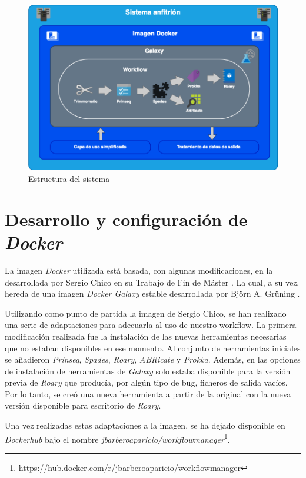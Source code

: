 \begin{figure}
    \begin{center}
      \includegraphics[scale=0.45]{images/DiagramaDelSistema.png}
      \caption{Estructura del sistema}
      \label{fig:DiagramaDelSistema}
    \end{center}
\end{figure}
\section{Desarrollo y configuración de \itshape{Docker}}
La imagen \textit{Docker} utilizada está basada, con algunas modificaciones, en la desarrollada por Sergio Chico en su Trabajo de Fin de Máster \cite{Chico2018}. La cual, a su vez, hereda de una imagen \textit{Docker Galaxy} estable desarrollada por Björn A. Grüning \cite{GalaxyDocker}.

Utilizando como punto de partida la imagen de Sergio Chico, se han realizado una serie de adaptaciones para adecuarla al uso de nuestro workflow. La primera modificación realizada fue la instalación de las nuevas herramientas necesarias que no estaban disponibles en ese momento. Al conjunto de herramientas iniciales se añadieron \textit{Prinseq}, \textit{Spades}, \textit{Roary}, \textit{ABRicate} y \textit{Prokka}. Además, en las opciones de instalación de herramientas de \textit{Galaxy} solo estaba disponible para la versión previa de \textit{Roary} que producía, por algún tipo de bug, ficheros de salida vacíos. Por lo tanto, se creó una nueva herramienta a partir de la original con la nueva versión disponible para escritorio de \textit{Roary}.

Una vez realizadas estas adaptaciones a la imagen, se ha dejado disponible en \textit{Dockerhub} bajo el nombre \textit{jbarberoaparicio/workflowmanager}\footnote{https://hub.docker.com/r/jbarberoaparicio/workflowmanager}. 

